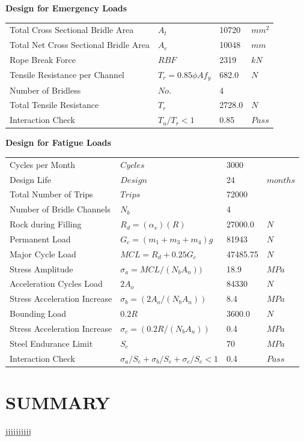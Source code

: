 \documentclass{article}%
\begin{document}
%
\textbf{Design for Emergency Loads}%
\begin{flushleft}%
\begin{minipage}{\textwidth}%
\flushleft%
\begin{tabular}{l l l l}%
Total Cross Sectional Bridle Area&$A_t$&10720&$mm^2$\\%
Total Net Cross Sectional Bridle Area&$A_e$&10048&$mm$\\%
Rope Break Force&$RBF$&2319&$kN$\\%
Tensile Resistance per Channel&$T_r = 0.85 \phi A f_y$&682.0&$N$\\%
Number of Bridless&$No.$&4&\\%
Total Tensile Resistance&$T_r$&2728.0&$N$\\%
Interaction Check&$T_u/T_r < 1$&0.85&$Pass$\\%
\end{tabular}%
\end{minipage}%
\end{flushleft}%
\newpage%
\textbf{Design for Fatigue Loads}%
\begin{flushleft}%
\begin{minipage}{\textwidth}%
\flushleft%
\begin{tabular}{l l l l}%
Cycles per Month&$Cycles$&3000&\\%
Design Life&$Design$&24&$months$\\%
Total Number of Trips&$Trips$&72000&\\%
Number of Bridle Channels&$N_b$&4&\\%
Rock during Filling&$R_d = (\alpha_v)(R)$&27000.0&$N$\\%
Permanent Load&$G_c = (m_1 + m_3 + m_4)g$&81943&$N$\\%
Major Cycle Load&$MCL = R_d + 0.25G_c$&47485.75&$N$\\%
Stress Amplitude&$\sigma_a = MCL/(N_b A_n))$&18.9&$MPa$\\%
Acceleration Cycles Load&$2A_o$&84330&$N$\\%
Stress Acceleration Increase&$\sigma_b = (2 A_o/(N_b A_n))$&8.4&$MPa$\\%
Bounding Load&$0.2R$&3600.0&$N$\\%
Stress Acceleration Increase&$\sigma_c = (0.2 R/(N_b A_n))$&0.4&$MPa$\\%
Steel Endurance Limit&$S_e$&70&$MPa$\\%
Interaction Check&$\sigma_a/S_e + \sigma_b/S_e + \sigma_c/S_e < 1$&0.4&$Pass$\\%
\end{tabular}%
\end{minipage}%
\end{flushleft}

%
\newpage

%
\section{SUMMARY}%
\label{sec:SUMMARY}%
jjjjjjjjjj

%
\end{document}
